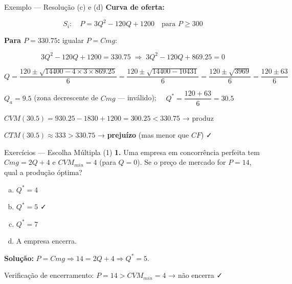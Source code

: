 \documentclass[
  ignorenonframetext,
  handout]{beamer}
\providecommand{\tightlist}{%
  \setlength{\itemsep}{0pt}\setlength{\parskip}{0pt}}
\begin{document}
\begin{frame}{Exemplo --- Resolução (c) e (d)}
\label{exemplo-resoluuxe7uxe3o-c-e-d}
\textbf{Curva de oferta:}

\[S_i\!: \quad P = 3Q^2 - 120Q + 1200 \quad \text{para } P \geq 300\]

\textbf{Para \(P = 330.75\):} igualar \(P = Cmg\):

\[3Q^2 - 120Q + 1200 = 330.75 \;\Rightarrow\; 3Q^2 - 120Q + 869.25 = 0\]

\[Q = \frac{120 \pm \sqrt{14400 - 4 \times 3 \times 869.25}}{6} = \frac{120 \pm \sqrt{14400 - 10431}}{6} = \frac{120 \pm \sqrt{3969}}{6} = \frac{120 \pm 63}{6}\]

\(Q_a = 9.5\) (zona decrescente de \(Cmg\) --- inválido);
\(\quad Q^* = \dfrac{120+63}{6} = 30.5\)

\(CVM(30.5) = 930.25 - 1830 + 1200 = 300.25 < 330.75\) → produz

\(CTM(30.5) \approx 333 > 330.75\) → \textbf{prejuízo} (mas menor que
\(CF\)) ✓
\end{frame}

\begin{frame}{Exercícios --- Escolha Múltipla (1)}
\label{exercuxedcios-escolha-muxfaltipla-1}
\textbf{1.} Uma empresa em concorrência perfeita tem \(Cmg = 2Q + 4\) e
\(CVM_{min} = 4\) (para \(Q = 0\)). Se o preço de mercado for
\(P = 14\), qual a produção óptima?

\begin{enumerate}
[a)]
\tightlist
\item
  \(Q^* = 4\)
\item
  \(Q^* = 5\) ✓
\item
  \(Q^* = 7\)
\item
  A empresa encerra.
\end{enumerate}

\textbf{Solução:}
\(P = Cmg \Rightarrow 14 = 2Q + 4 \Rightarrow Q^* = 5\).

Verificação de encerramento: \(P = 14 > CVM_{min} = 4\) → não encerra ✓
\end{frame}
\end{document}
